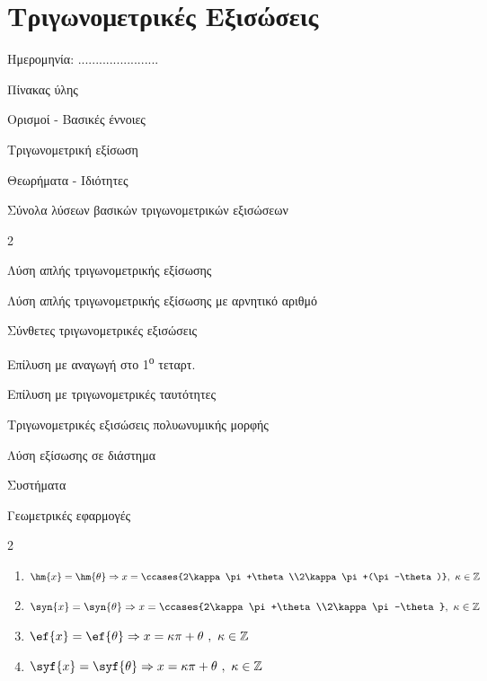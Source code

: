 \documentclass[twoside,nofonts,internet,math,spyros]{frontisthrio}
\newcommand{\tss}[1]{\textsuperscript{#1}}
\newcommand{\myitem}{\stepcounter{enumi}\item[\raisebox{0.5mm}{\faEdit}\ \Large$\square$]}
\begin{document}
\newpage
\section{Τριγωνομετρικές Εξισώσεις}
\begin{flushright}
\faCalendar* Ημερομηνία: .......................
\end{flushright}
\begin{mybox}[mysubtitle]{Πίνακας ύλης}
\begin{tcbraster}[raster columns=2,raster equal height]
\begin{myleftbox}{Ορισμοί - Βασικές έννοιες\ \ \faBook}
\begin{arithmisi}[itemsep=0mm]
\item Τριγωνομετρική εξίσωση
\end{arithmisi}
\end{myleftbox}
\begin{myrightbox}{Θεωρήματα - Ιδιότητες\ \ \faTools}
\begin{arithmisi}[itemsep=0mm]
\item Σύνολα λύσεων βασικών τριγωνομετρικών εξισώσεων
\end{arithmisi}
\end{myrightbox}
\end{tcbraster}
\begin{multicols}{2}
\begin{todolist}[itemsep=0mm]
\myitem Λύση απλής τριγωνομετρικής εξίσωσης
\myitem Λύση απλής τριγωνομετρικής εξίσωσης με αρνητικό αριθμό
\item Σύνθετες τριγωνομετρικές εξισώσεις
\item Επίλυση με αναγωγή στο 1\tss{ο} τεταρτ.
\item Επίλυση με τριγωνομετρικές ταυτότητες
\item Τριγωνομετρικές εξισώσεις πολυωνυμικής μορφής
\item Λύση εξίσωσης σε διάστημα
\item Συστήματα
\item Γεωμετρικές εφαρμογές
\end{todolist}
\end{multicols}
\begin{multicols}{2}
\begin{enumerate}[itemsep=0mm,leftmargin=4mm]
\item $ \hm{x}=\hm{\theta}\Rightarrow\\ x=\ccases{2\kappa\pi+\theta\\2\kappa\pi+(\pi-\theta)},\ \kappa\in\mathbb{Z} $
\item $ \syn{x}=\syn{\theta}\Rightarrow x=\ccases{2\kappa\pi+\theta\\2\kappa\pi-\theta},\ \kappa\in\mathbb{Z} $
\item $\ef{x}=\ef{\theta}\Rightarrow x=\kappa\pi+\theta\ ,\ \kappa\in\mathbb{Z}$
\item $\syf{x}=\syf{\theta}\Rightarrow x=\kappa\pi+\theta\ ,\ \kappa\in\mathbb{Z}$
\end{enumerate}
\end{multicols}
\end{mybox}
\end{document}
